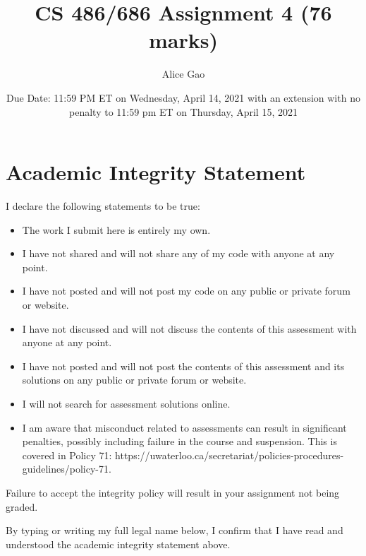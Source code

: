 \documentclass[12pt]{article}
\title{CS 486/686 Assignment 4 (76 marks)}
\author{Alice Gao}
\date{Due Date: 11:59 PM ET on Wednesday, April 14, 2021
with an extension with no penalty to 11:59 pm ET on Thursday, April 15, 2021}
\begin{document}
\maketitle



\newpage
\section*{Academic Integrity Statement}

I declare the following statements to be true:

\begin{itemize}
\item 
The work I submit here is entirely my own.

\item 	
I have not shared and will not share any of my code with anyone at any point. 

\item 
I have not posted and will not post my code on any public or private forum or website.

\item 	
I have not discussed and will not discuss the contents of this assessment with anyone at any point.

\item 
I have not posted and will not post the contents of this assessment and its solutions on any public or private forum or website. 

\item 
I will not search for assessment solutions online.

\item 
I am aware that misconduct related to assessments can result in significant penalties, possibly including failure in the course and suspension. This is covered in Policy 71: https://uwaterloo.ca/secretariat/policies-procedures-guidelines/policy-71.
\end{itemize}

Failure to accept the integrity policy will result in your assignment not being graded.

By typing or writing my full legal name below, I confirm that I have read and understood the academic integrity statement above.
\end{document}
